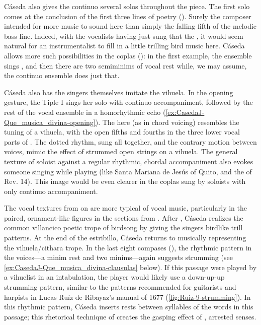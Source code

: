 Cáseda also gives the continuo several solos throughout the piece.
The first solo comes at the conclusion of the first three lines of poetry ().
Surely the composer intended for more music to sound here than simply the falling fifth of the melodic bass line.
Indeed, with the vocalists having just sung that the , it would seem natural for an instrumentalist to fill in a little trilling bird music here.
Cáseda allows more such possibilities in the coplas (): in the first example, the ensemble sings , and then there are two semiminims of vocal rest while, we may assume, the continuo ensemble does just that.

Cáseda also has the singers themselves imitate the vihuela.
In the opening gesture, the Tiple I sings her solo with continuo accompaniment, followed by the rest of the vocal ensemble in a homorhythmic echo (\cref{ex:CasedaJ-Que_musica_divina-opening}).
The  here (as in chord voicing) resembles the tuning of a vihuela, with the open fifths and fourths in the three lower vocal parts of .
The dotted rhythm, sung all together, and the contrary motion between voices, mimic the effect of strummed open strings on a vihuela.
The general texture of soloist against a regular rhythmic, chordal accompaniment also evokes someone singing while playing (like Santa Mariana de Jesús of Quito, and the  of Rev. 14).
This image would be even clearer in the coplas sung by soloists with only continuo accompaniment.


The vocal textures from  on are more typical of vocal music, particularly in the paired, ornament-like figures in the sections from .
After , Cáseda realizes the common villancico poetic trope of birdsong by giving the singers birdlike trill patterns. 
At the end of the estribillo, Cáseda returns to musically representing the vihuela/cithara trope.
In the last eight compases (), the rhythmic pattern in the voices---a minim rest and two minims---again suggests strumming (see \cref{ex:CasedaJ-Que_musica_divina-clausulas} below).
If this passage were played by a vihuelist in an intabulation, the player would likely use a down-up-up strumming pattern, similar to the patterns recommended for guitarists and harpists in Lucas Ruíz de Ribayaz's manual  of 1677 (\cref{fig:Ruiz-9-strumming}).%
	\autocite[9]{Ruiz:Luz}
In this rhythmic pattern, Cáseda inserts rests between syllables of the words in this passage; this rhetorical technique of  creates the gasping effect of , arrested senses.

